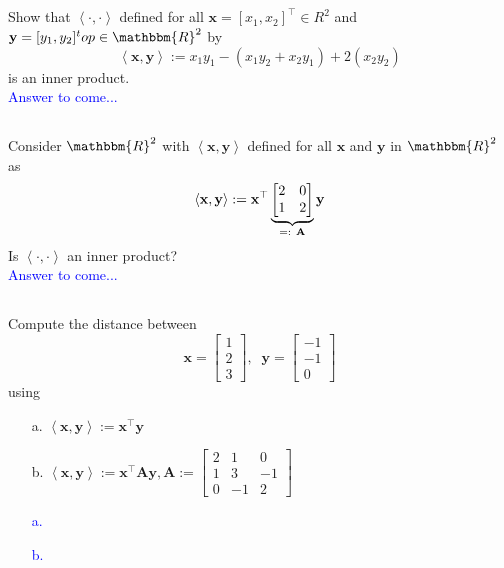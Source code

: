 \documentclass[a4paper,12pt]{article}
\newcommand{\Ubr}[2]{\underbrace{ #1 }_{\mathclap{\text{ #2 }}}}
\newcommand{\R}{\mathbbm{R}}
\newcommand{\M}[1]{ \begin{bmatrix} #1 \end{bmatrix} }
\newcommand{\vsp}[1]{\vspace{#1mm}\\}
\newcommand{\vecx}{\textbf{x}}
\newcommand{\vecy}{\textbf{y}}
\newcommand{\matA}{\textbf{A}}
\begin{document}
\subsection{}
Show that $\left< \cdot,\cdot \right>$ defined for all $\vecx = [x_1, x_2]^\top \in R^2$ and $\vecy = [y_1,y_2]^top \in \R^2$ by
$$\left< \vecx, \vecy \right> := x_1 y_1 - (x_1y_2 + x_2y_1) + 2(x_2y_2)$$
is an inner product.
\vsp{3}
\textcolor{blue}{
Answer to come...
}
\subsection{}
Consider $\R^2$ with $\left< \vecx, \vecy \right>$ defined for all $\vecx$ and $\vecy$ in $\R^2$ as
$$\left< \vecx, \vecy \right> := \vecx^\top \Ubr{\M{2&0\\1&2}}{=: \matA} \vecy$$
Is $\left< \cdot, \cdot \right>$ an inner product?
\vsp{3}
\textcolor{blue}{
Answer to come...
}
\subsection{}
Compute the distance between
$$\vecx=\M{1\\2\\3}, \;\; \vecy = \M{-1\\-1\\0}$$
using
\begin{itemize}
 \item [a.] $\left< \vecx, \vecy \right> := \vecx^\top \vecy$
 \item [b.] $\left< \vecx, \vecy \right> := \vecx^\top \matA \vecy, \matA := \M{2&1&0\\1&3&-1\\0&-1&2}$
\end{itemize}
\textcolor{blue}{
\begin{itemize}
 \item [a.] 
 \item [b.] 
\end{itemize}
}
\end{document}
